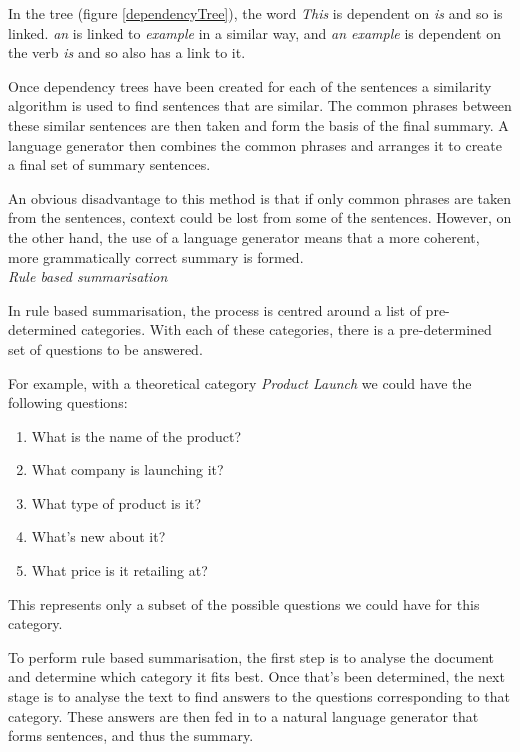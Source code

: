 \documentclass[12pt]{article}
\begin{document}
In the tree (figure \ref{dependencyTree}), the word \emph{This} is dependent on \emph{is} and so is linked. \emph{an} is linked to \emph{example} in a similar way, and \emph{an example} is dependent on the verb \emph{is} and so also has a link to it. 

Once dependency trees have been created for each of the sentences a similarity algorithm is used to find sentences that are similar. The common phrases between these similar sentences are then taken and form the basis of the final summary. A language generator then combines the common phrases and arranges it to create a final set of summary sentences.

An obvious disadvantage to this method is that if only common phrases are taken from the sentences, context could be lost from some of the sentences. However, on the other hand, the use of a language generator means that a more coherent, more grammatically correct summary is formed. \\

\emph{Rule based summarisation}

In rule based summarisation\cite{ruleBasedSummarisation}, the process is centred around a list of pre-determined categories. With each of these categories, there is a pre-determined set of questions to be answered. 

For example, with a theoretical category \emph{Product Launch} we could have the following questions:

\begin{enumerate}
	\item What is the name of the product?
	\item What company is launching it?
	\item What type of product is it?
	\item What's new about it?
	\item What price is it retailing at?
\end{enumerate}

This represents only a subset of the possible questions we could have for this category.

To perform rule based summarisation, the first step is to analyse the document and determine which category it fits best. Once that's been determined, the next stage is to analyse the text to find answers to the questions corresponding to that category. These answers are then fed in to a natural language generator that forms sentences, and thus the summary.
\end{document}
